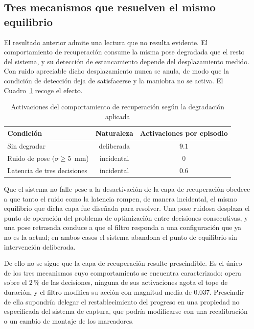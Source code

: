 \subsection*{Tres mecanismos que resuelven el mismo equilibrio}

El resultado anterior admite una lectura que no resulta evidente. El
comportamiento de recuperación consume la misma pose degradada que el resto del
sistema, y su detección de estancamiento depende del desplazamiento medido. Con
ruido apreciable dicho desplazamiento nunca se anula, de modo que la condición
de detección deja de satisfacerse y la maniobra no se activa. El
Cuadro~\ref{tab:mecanismos} recoge el efecto.

\begin{table}[h]
    \centering\captionsetup{width=0.85\linewidth}
    \caption{Activaciones del comportamiento de recuperación según la
             degradación aplicada}
    \begin{tabular}{lcc}
        \textbf{Condición} & \textbf{Naturaleza} &
        \textbf{Activaciones por episodio} \\
        \hline
        Sin degradar & deliberada & $9{.}1$ \\
        Ruido de pose ($\sigma \geq 5$~mm) & incidental & $0$ \\
        Latencia de tres decisiones & incidental & $0{.}6$ \\
    \end{tabular}
    \label{tab:mecanismos}
\end{table}

Que el sistema no falle pese a la desactivación de la capa de recuperación
obedece a que tanto el ruido como la latencia rompen, de manera incidental, el
mismo equilibrio que dicha capa fue diseñada para resolver. Una pose ruidosa
desplaza el punto de operación del problema de optimización entre decisiones
consecutivas, y una pose retrasada conduce a que el filtro responda a una
configuración que ya no es la actual; en ambos casos el sistema abandona el
punto de equilibrio sin intervención deliberada.

De ello no se sigue que la capa de recuperación resulte prescindible. Es el
único de los tres mecanismos cuyo comportamiento se encuentra caracterizado:
opera sobre el $2$\,\% de las decisiones, ninguna de sus activaciones agota el
tope de duración, y el filtro modifica su acción con magnitud media de
$0{.}037$. Prescindir de ella supondría delegar el restablecimiento del
progreso en una propiedad no especificada del sistema de captura, que podría
modificarse con una recalibración o un cambio de montaje de los marcadores.

